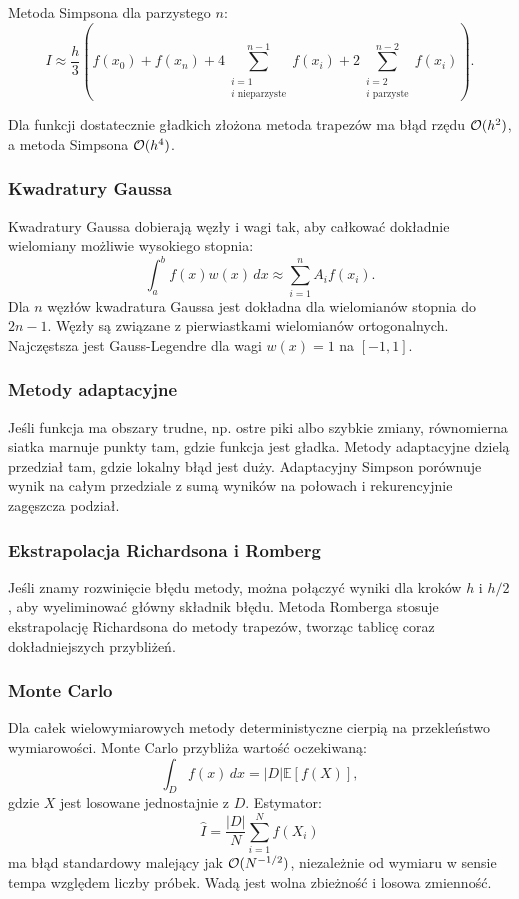 Metoda Simpsona dla parzystego $n$:
\[
I\approx \frac{h}{3}\left(f(x_0)+f(x_n)+4\sum_{\substack{i=1\\i\text{ nieparzyste}}}^{n-1}f(x_i)+2\sum_{\substack{i=2\\i\text{ parzyste}}}^{n-2}f(x_i)\right).
\]

Dla funkcji dostatecznie gładkich złożona metoda trapezów ma błąd rzędu $\mathcal{O}(h^2)$, a metoda Simpsona $\mathcal{O}(h^4)$.

\subsubsection{Kwadratury Gaussa}

Kwadratury Gaussa dobierają węzły i wagi tak, aby całkować dokładnie wielomiany możliwie wysokiego stopnia:
\[
\int_a^b f(x)w(x)\,dx\approx \sum_{i=1}^{n} A_i f(x_i).
\]
Dla $n$ węzłów kwadratura Gaussa jest dokładna dla wielomianów stopnia do $2n-1$. Węzły są związane z pierwiastkami wielomianów ortogonalnych. Najczęstsza jest Gauss-Legendre dla wagi $w(x)=1$ na $[-1,1]$.

\subsubsection{Metody adaptacyjne}

Jeśli funkcja ma obszary trudne, np. ostre piki albo szybkie zmiany, równomierna siatka marnuje punkty tam, gdzie funkcja jest gładka. Metody adaptacyjne dzielą przedział tam, gdzie lokalny błąd jest duży. Adaptacyjny Simpson porównuje wynik na całym przedziale z sumą wyników na połowach i rekurencyjnie zagęszcza podział.

\subsubsection{Ekstrapolacja Richardsona i Romberg}

Jeśli znamy rozwinięcie błędu metody, można połączyć wyniki dla kroków $h$ i $h/2$, aby wyeliminować główny składnik błędu. Metoda Romberga stosuje ekstrapolację Richardsona do metody trapezów, tworząc tablicę coraz dokładniejszych przybliżeń.

\subsubsection{Monte Carlo}

Dla całek wielowymiarowych metody deterministyczne cierpią na przekleństwo wymiarowości. Monte Carlo przybliża wartość oczekiwaną:
\[
\int_D f(x)\,dx = |D|\mathbb{E}[f(X)],
\]
gdzie $X$ jest losowane jednostajnie z $D$. Estymator:
\[
\hat I=\frac{|D|}{N}\sum_{i=1}^{N}f(X_i)
\]
ma błąd standardowy malejący jak $\mathcal{O}(N^{-1/2})$, niezależnie od wymiaru w sensie tempa względem liczby próbek. Wadą jest wolna zbieżność i losowa zmienność.

